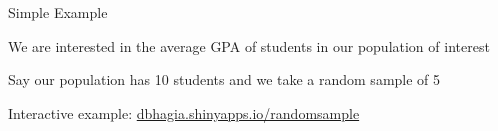 \documentclass{./../div_teaching_slides}
\begin{document}

\begin{frame}{Simple Example}
\begin{witemize}
\item We are interested in the average GPA of students in our population of interest
 \item Say our population has 10 students and we take a random sample of 5
\item Interactive example: \href{https://dbhagia.shinyapps.io/randomsample/}{dbhagia.shinyapps.io/randomsample}
\end{witemize}
\end{frame}
\end{document}
